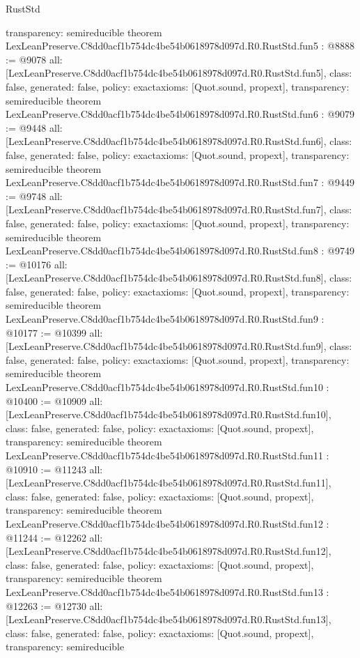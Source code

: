 \begin{lexlean}{RustStd}
\begin{coremodule}
{  transparency: semireducible
}
theorem LexLeanPreserve.C8dd0acf1b754dc4be54b0618978d097d.R0.RustStd.fun5 : @8888 := @9078 {
  all: [LexLeanPreserve.C8dd0acf1b754dc4be54b0618978d097d.R0.RustStd.fun5],
  class: false,
  generated: false,
  policy: exact{axioms: [Quot.sound, propext]},
  transparency: semireducible
}
theorem LexLeanPreserve.C8dd0acf1b754dc4be54b0618978d097d.R0.RustStd.fun6 : @9079 := @9448 {
  all: [LexLeanPreserve.C8dd0acf1b754dc4be54b0618978d097d.R0.RustStd.fun6],
  class: false,
  generated: false,
  policy: exact{axioms: [Quot.sound, propext]},
  transparency: semireducible
}
theorem LexLeanPreserve.C8dd0acf1b754dc4be54b0618978d097d.R0.RustStd.fun7 : @9449 := @9748 {
  all: [LexLeanPreserve.C8dd0acf1b754dc4be54b0618978d097d.R0.RustStd.fun7],
  class: false,
  generated: false,
  policy: exact{axioms: [Quot.sound, propext]},
  transparency: semireducible
}
theorem LexLeanPreserve.C8dd0acf1b754dc4be54b0618978d097d.R0.RustStd.fun8 : @9749 := @10176 {
  all: [LexLeanPreserve.C8dd0acf1b754dc4be54b0618978d097d.R0.RustStd.fun8],
  class: false,
  generated: false,
  policy: exact{axioms: [Quot.sound, propext]},
  transparency: semireducible
}
theorem LexLeanPreserve.C8dd0acf1b754dc4be54b0618978d097d.R0.RustStd.fun9 : @10177 := @10399 {
  all: [LexLeanPreserve.C8dd0acf1b754dc4be54b0618978d097d.R0.RustStd.fun9],
  class: false,
  generated: false,
  policy: exact{axioms: [Quot.sound, propext]},
  transparency: semireducible
}
theorem LexLeanPreserve.C8dd0acf1b754dc4be54b0618978d097d.R0.RustStd.fun10 : @10400 := @10909 {
  all: [LexLeanPreserve.C8dd0acf1b754dc4be54b0618978d097d.R0.RustStd.fun10],
  class: false,
  generated: false,
  policy: exact{axioms: [Quot.sound, propext]},
  transparency: semireducible
}
theorem LexLeanPreserve.C8dd0acf1b754dc4be54b0618978d097d.R0.RustStd.fun11 : @10910 := @11243 {
  all: [LexLeanPreserve.C8dd0acf1b754dc4be54b0618978d097d.R0.RustStd.fun11],
  class: false,
  generated: false,
  policy: exact{axioms: [Quot.sound, propext]},
  transparency: semireducible
}
theorem LexLeanPreserve.C8dd0acf1b754dc4be54b0618978d097d.R0.RustStd.fun12 : @11244 := @12262 {
  all: [LexLeanPreserve.C8dd0acf1b754dc4be54b0618978d097d.R0.RustStd.fun12],
  class: false,
  generated: false,
  policy: exact{axioms: [Quot.sound, propext]},
  transparency: semireducible
}
theorem LexLeanPreserve.C8dd0acf1b754dc4be54b0618978d097d.R0.RustStd.fun13 : @12263 := @12730 {
  all: [LexLeanPreserve.C8dd0acf1b754dc4be54b0618978d097d.R0.RustStd.fun13],
  class: false,
  generated: false,
  policy: exact{axioms: [Quot.sound, propext]},
  transparency: semireducible
}
\end{coremodule}
\end{lexlean}
